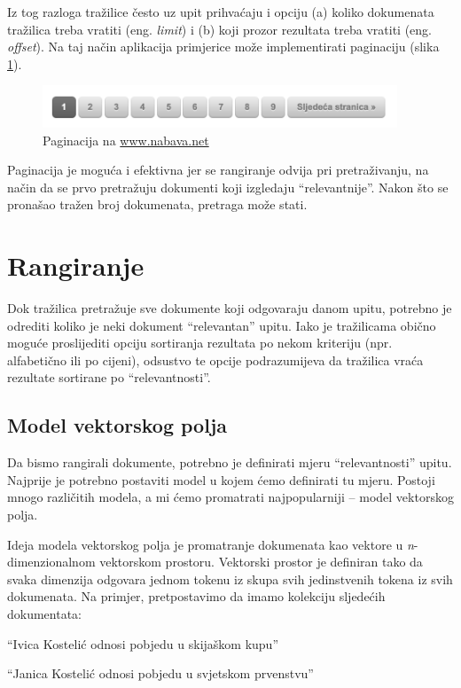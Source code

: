 \documentclass[a4paper,twoside,12pt]{scrreprt}
\begin{document}
Iz tog razloga tražilice često uz upit prihvaćaju i opciju (a) koliko dokumenata tražilica treba vratiti (eng. \textit{limit}) i (b) koji prozor rezultata treba vratiti (eng. \textit{offset}). Na taj način aplikacija primjerice može implementirati paginaciju (slika \ref{pagination}).

\begin{figure}[H]
  \centering
  \includegraphics[width=300pt]{pagination}
  \caption{Paginacija na \url{www.nabava.net}}
  \label{pagination}
\end{figure}

Paginacija je moguća i efektivna jer se rangiranje odvija pri pretraživanju, na način da se prvo pretražuju dokumenti koji izgledaju ``relevantnije''. Nakon što se pronašao tražen broj dokumenata, pretraga može stati.

\section{Rangiranje}

Dok tražilica pretražuje sve dokumente koji odgovaraju danom upitu, potrebno je odrediti koliko je neki dokument ``relevantan'' upitu. Iako je tražilicama obično moguće proslijediti opciju sortiranja rezultata po nekom kriteriju (npr. alfabetično ili po cijeni), odsustvo te opcije podrazumijeva da tražilica vraća rezultate sortirane po ``relevantnosti''.

\subsection{Model vektorskog polja}

Da bismo rangirali dokumente, potrebno je definirati mjeru ``relevantnosti'' upitu. Najprije je potrebno postaviti model u kojem ćemo definirati tu mjeru. Postoji mnogo različitih modela, a mi ćemo promatrati najpopularniji – model vektorskog polja.

Ideja modela vektorskog polja je promatranje dokumenata kao vektore u \textit{n}-dimenzionalnom vektorskom prostoru. Vektorski prostor je definiran tako da svaka dimenzija odgovara jednom tokenu iz skupa svih jedinstvenih tokena iz svih dokumenata. Na primjer, pretpostavimo da imamo kolekciju sljedećih dokumentata:

\begin{compactenum}
  \item ``Ivica Kostelić odnosi pobjedu u skijaškom kupu''
  \item ``Janica Kostelić odnosi pobjedu u svjetskom prvenstvu''
\end{compactenum}
\end{document}
